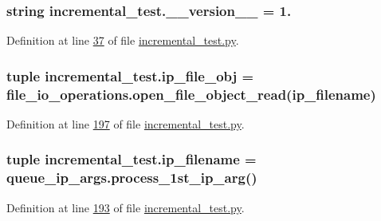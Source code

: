 \subsubsection[{\+\_\+\+\_\+version\+\_\+\+\_\+}]{\setlength{\rightskip}{0pt plus 5cm}string incremental\+\_\+test.\+\_\+\+\_\+version\+\_\+\+\_\+ = \textquotesingle{}1.\textquotesingle{}}\label{namespaceincremental__test_a0f94dd1f320b9558e27a5809d2041c4c}


Definition at line \hyperlink{incremental__test_8py_source_l00037}{37} of file \hyperlink{incremental__test_8py_source}{incremental\+\_\+test.\+py}.

\hypertarget{namespaceincremental__test_aaf431f9a2a2d1172f09263453438e4f4}{}
\subsubsection[{ip\+\_\+file\+\_\+obj}]{\setlength{\rightskip}{0pt plus 5cm}tuple incremental\+\_\+test.\+ip\+\_\+file\+\_\+obj = {\bf file\+\_\+io\+\_\+operations.\+open\+\_\+file\+\_\+object\+\_\+read}({\bf ip\+\_\+filename})}\label{namespaceincremental__test_aaf431f9a2a2d1172f09263453438e4f4}


Definition at line \hyperlink{incremental__test_8py_source_l00197}{197} of file \hyperlink{incremental__test_8py_source}{incremental\+\_\+test.\+py}.

\hypertarget{namespaceincremental__test_ab5a7aa877c2dae060e3fd03a472cbbf3}{}
\subsubsection[{ip\+\_\+filename}]{\setlength{\rightskip}{0pt plus 5cm}tuple incremental\+\_\+test.\+ip\+\_\+filename = {\bf queue\+\_\+ip\+\_\+args.\+process\+\_\+1st\+\_\+ip\+\_\+arg}()}\label{namespaceincremental__test_ab5a7aa877c2dae060e3fd03a472cbbf3}


Definition at line \hyperlink{incremental__test_8py_source_l00193}{193} of file \hyperlink{incremental__test_8py_source}{incremental\+\_\+test.\+py}.

